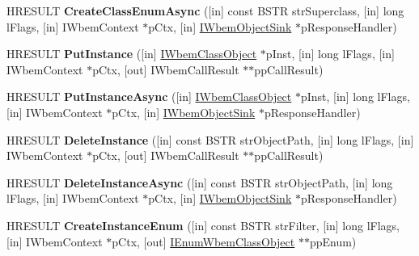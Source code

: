 \begin{DoxyCompactItemize}
H\+R\+E\+S\+U\+LT {\bfseries Create\+Class\+Enum\+Async} (\mbox{[}in\mbox{]} const B\+S\+TR str\+Superclass, \mbox{[}in\mbox{]} long l\+Flags, \mbox{[}in\mbox{]} I\+Wbem\+Context $\ast$p\+Ctx, \mbox{[}in\mbox{]} \hyperlink{interface_i_wbem_object_sink}{I\+Wbem\+Object\+Sink} $\ast$p\+Response\+Handler)
\item 
\mbox{\label{interface_i_wbem_services_a4d0f3e069a3999c44b8df6aa05ab8143}} 
H\+R\+E\+S\+U\+LT {\bfseries Put\+Instance} (\mbox{[}in\mbox{]} \hyperlink{interface_i_wbem_class_object}{I\+Wbem\+Class\+Object} $\ast$p\+Inst, \mbox{[}in\mbox{]} long l\+Flags, \mbox{[}in\mbox{]} I\+Wbem\+Context $\ast$p\+Ctx, \mbox{[}out\mbox{]} I\+Wbem\+Call\+Result $\ast$$\ast$pp\+Call\+Result)
\item 
\mbox{\label{interface_i_wbem_services_a7aabc96807e492812d8035b0cd2dcf3a}} 
H\+R\+E\+S\+U\+LT {\bfseries Put\+Instance\+Async} (\mbox{[}in\mbox{]} \hyperlink{interface_i_wbem_class_object}{I\+Wbem\+Class\+Object} $\ast$p\+Inst, \mbox{[}in\mbox{]} long l\+Flags, \mbox{[}in\mbox{]} I\+Wbem\+Context $\ast$p\+Ctx, \mbox{[}in\mbox{]} \hyperlink{interface_i_wbem_object_sink}{I\+Wbem\+Object\+Sink} $\ast$p\+Response\+Handler)
\item 
\mbox{\label{interface_i_wbem_services_a9898680d0749852157555f2ddb9d42af}} 
H\+R\+E\+S\+U\+LT {\bfseries Delete\+Instance} (\mbox{[}in\mbox{]} const B\+S\+TR str\+Object\+Path, \mbox{[}in\mbox{]} long l\+Flags, \mbox{[}in\mbox{]} I\+Wbem\+Context $\ast$p\+Ctx, \mbox{[}out\mbox{]} I\+Wbem\+Call\+Result $\ast$$\ast$pp\+Call\+Result)
\item 
\mbox{\label{interface_i_wbem_services_ab4b21e71eba9314a7174d2f0ecd7d14a}} 
H\+R\+E\+S\+U\+LT {\bfseries Delete\+Instance\+Async} (\mbox{[}in\mbox{]} const B\+S\+TR str\+Object\+Path, \mbox{[}in\mbox{]} long l\+Flags, \mbox{[}in\mbox{]} I\+Wbem\+Context $\ast$p\+Ctx, \mbox{[}in\mbox{]} \hyperlink{interface_i_wbem_object_sink}{I\+Wbem\+Object\+Sink} $\ast$p\+Response\+Handler)
\item 
\mbox{\label{interface_i_wbem_services_a3e3c446c57d3151d8e9c9fd460e6ba3d}} 
H\+R\+E\+S\+U\+LT {\bfseries Create\+Instance\+Enum} (\mbox{[}in\mbox{]} const B\+S\+TR str\+Filter, \mbox{[}in\mbox{]} long l\+Flags, \mbox{[}in\mbox{]} I\+Wbem\+Context $\ast$p\+Ctx, \mbox{[}out\mbox{]} \hyperlink{interface_i_enum_wbem_class_object}{I\+Enum\+Wbem\+Class\+Object} $\ast$$\ast$pp\+Enum)
$$
\end{DoxyCompactItemize}
